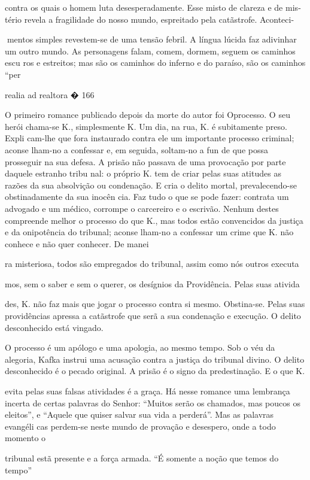 contra os quais o homem luta desesperadamente. Esse misto de clareza e
de mis­ tério revela a fragilidade do nosso mundo, espreitado pela
catãstrofe. Aconteci-

mentos simples revestem-se de uma tensão febril. A língua lúcida faz
adivinhar um outro mundo. As personagens falam, comem, dormem, seguem os
caminhos escu­ ros e estreitos; mas são os caminhos do inferno e do
paraíso, são os caminhos ``per

realia ad realtora � 166

O primeiro romance publicado depois da morte do autor foi Oprocesso. O
seu herói chama-se K., simplesmente K. Um dia, na rua, K. é subitamente
preso. Expli­ cam-lhe que fora instaurado contra ele um importante
processo criminal; aconse­ lham-no a confessar e, em seguida, soltam-no
a fun de que possa prosseguir na sua defesa. A prisão não passava de uma
provocação por parte daquele estranho tribu­ nal: o próprio K. tem de
criar pelas suas atitudes as razões da sua absolvição ou condenação. E
cria o delito mortal, prevalecendo-se obstinadamente da sua inocên­ cia.
Faz tudo o que se pode fazer: contrata um advogado e um médico, corrompe
o carcereiro e o escrivão. Nenhum destes compreende melhor o processo do
que K., mas todos estão convencidos da justiça e da onipotência do
tribunal; aconse­ lham-no a confessar um crime que K. não conhece e não
quer conhecer. De manei­

ra misteriosa, todos são empregados do tribunal, assim como nós outros
executa­

mos, sem o saber e sem o querer, os desígnios da Providência. Pelas suas
ativida­

des, K. não faz mais que jogar o processo contra si mesmo. Obstina-se.
Pelas suas providências apressa a catãstrofe que serã a sua condenação e
execução. O delito desconhecido está vingado.

O processo é um apólogo e uma apologia, ao mesmo tempo. Sob o véu da
alegoria, Kafka instrui uma acusação contra a justiça do tribunal
divino. O delito desconhecido é o pecado original. A prisão é o signo da
predestinação. E o que K.

evita pelas suas falsas atividades é a graça. Há nesse romance uma
lembrança incerta de certas palavras do Senhor: ``Muitos serão os
chamados, mas poucos os eleitos'', e ``Aquele que quiser salvar sua vida
a perderá''. Mas as palavras evangéli­ cas perdem-se neste mundo de
provação e desespero, onde a todo momento o

tribunal estã presente e a força armada. ``É somente a noção que temos
do tempo''

